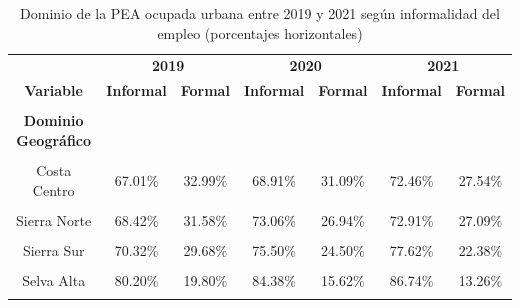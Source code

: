 \documentclass[
  letterpaper,
  12pt,
  oneside,
  spanish,
  doublespacing,
  headsepline,
  parskip]{MastersDoctoralThesis}
\begin{document}
\hypertarget{tbl-dominio}{}
\begin{table}[H]
\caption{\label{tbl-dominio}Dominio de la PEA ocupada urbana entre 2019 y 2021 según informalidad
del empleo (porcentajes horizontales) }\tabularnewline

\centering\begingroup\fontsize{10}{12}\selectfont

\begin{tabular}{ccccccc}
\toprule
\multicolumn{1}{c}{ } & \multicolumn{2}{c}{\textbf{2019}} & \multicolumn{2}{c}{\textbf{2020}} & \multicolumn{2}{c}{\textbf{2021}} \\
\cmidrule(l{3pt}r{3pt}){2-3} \cmidrule(l{3pt}r{3pt}){4-5} \cmidrule(l{3pt}r{3pt}){6-7}
\textbf{Variable} & \textbf{Informal} & \textbf{Formal} & \textbf{Informal} & \textbf{Formal} & \textbf{Informal} & \textbf{Formal}\\
\midrule
\cellcolor{gray!6}{\textbf{Nacional}} & \cellcolor{gray!6}{66.40\%} & \cellcolor{gray!6}{33.60\%} & \cellcolor{gray!6}{68.42\%} & \cellcolor{gray!6}{31.58\%} & \cellcolor{gray!6}{71.41\%} & \cellcolor{gray!6}{28.59\%}\\
\textbf{Dominio Geográfico} &  &  &  &  &  & \\
\cellcolor{gray!6}{Costa Norte} & \cellcolor{gray!6}{72.53\%} & \cellcolor{gray!6}{27.47\%} & \cellcolor{gray!6}{72.42\%} & \cellcolor{gray!6}{27.58\%} & \cellcolor{gray!6}{74.56\%} & \cellcolor{gray!6}{25.44\%}\\
Costa Centro & 67.01\% & 32.99\% & 68.91\% & 31.09\% & 72.46\% & 27.54\%\\
\cellcolor{gray!6}{Costa Sur} & \cellcolor{gray!6}{68.12\%} & \cellcolor{gray!6}{31.88\%} & \cellcolor{gray!6}{67.92\%} & \cellcolor{gray!6}{32.08\%} & \cellcolor{gray!6}{73.02\%} & \cellcolor{gray!6}{26.98\%}\\
\addlinespace
Sierra Norte & 68.42\% & 31.58\% & 73.06\% & 26.94\% & 72.91\% & 27.09\%\\
\cellcolor{gray!6}{Sierra Centro} & \cellcolor{gray!6}{73.02\%} & \cellcolor{gray!6}{26.98\%} & \cellcolor{gray!6}{75.78\%} & \cellcolor{gray!6}{24.22\%} & \cellcolor{gray!6}{80.20\%} & \cellcolor{gray!6}{19.80\%}\\
Sierra Sur & 70.32\% & 29.68\% & 75.50\% & 24.50\% & 77.62\% & 22.38\%\\
\cellcolor{gray!6}{Selva Baja} & \cellcolor{gray!6}{74.84\%} & \cellcolor{gray!6}{25.16\%} & \cellcolor{gray!6}{80.69\%} & \cellcolor{gray!6}{19.31\%} & \cellcolor{gray!6}{83.04\%} & \cellcolor{gray!6}{16.96\%}\\
Selva Alta & 80.20\% & 19.80\% & 84.38\% & 15.62\% & 86.74\% & 13.26\%\\
\addlinespace
\cellcolor{gray!6}{Lima Metropolitana} & \cellcolor{gray!6}{58.60\%} & \cellcolor{gray!6}{41.40\%} & \cellcolor{gray!6}{58.22\%} & \cellcolor{gray!6}{41.78\%} & \cellcolor{gray!6}{61.99\%} & \cellcolor{gray!6}{38.01\%}\\
\bottomrule
\end{tabular}
\endgroup{}
\end{table}
\end{document}
